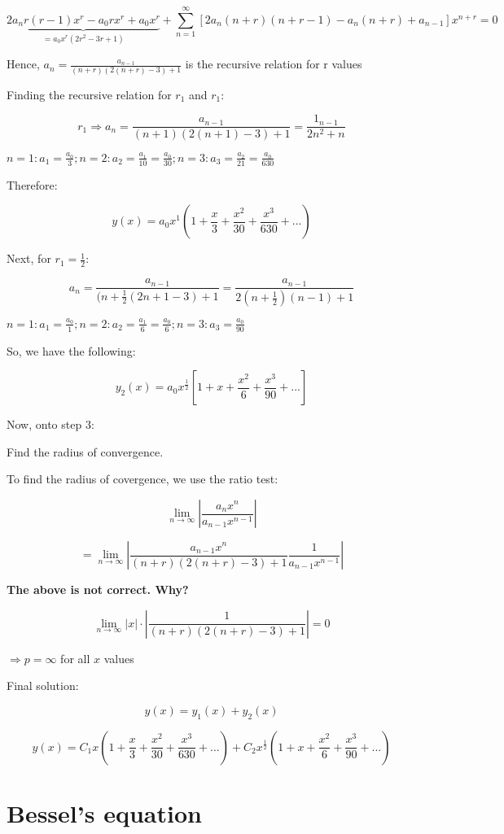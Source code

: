 \documentclass{article}
\begin{document}
$$\underbrace{2 a_n r(r-1)x^r - a_0 r x^r + a_0 x^r}_{ = a_0 x^r \left( 2r^2 - 3r + 1 \right)} + \sum_{n = 1}^\infty \left[ 2 a_n (n+r) (n+r-1) - a_n (n+r) + a_{n-1} \right] x^{n+r} = 0$$

Hence, $a_n = \frac{a_{n-1}}{(n+r)(2(n+r)-3) + 1}$ is the recursive relation for r values

Finding the recursive relation for $r_1$ and $r_1$:

$$r_1 \Rightarrow a_n = \frac{a_{n-1}}{(n+1)(2(n+1)-3)+1} = \frac{1_{n-1}}{2n^2 + n}$$

$n = 1: a_1 = \frac{a_0}{3}; n = 2: a_2 = \frac{a_1}{10} = \frac{a_0}{30}; n = 3: a_3 = \frac{a_2}{21} = \frac{a_0}{630}$

Therefore:

$$y(x) = a_0 x^1 (1 + \frac{x}{3} + \frac{x^2}{30} + \frac{x^3}{630} + ...)$$

Next, for $r_1 = \frac{1}{2}$:

$$a_n  =\frac{a_{n-1}}{(n + \frac{1}{2} (2n+1-3) + 1} = \frac{a_{n-1}}{2(n + \frac{1}{2})(n-1) + 1}$$

$n = 1: a_1 = \frac{a_0}{1}; n = 2:  a_2 = \frac{a_1}{6} = \frac{a_0}{6}; n = 3: a_3 = \frac{a_0}{90}$

So, we have the following:

$$y_2(x) = a_0 x^{\frac{1}{2}} \left[ 1 + x + \frac{x^2}{6} + \frac{x^3}{90} + ... \right]$$

Now, onto step 3:

Find the radius of convergence. 

To find the radius of covergence, we use the ratio test:

$$\lim_{n \to \infty} | \frac{a_n x^n}{a_{n-1}x^{n-1}}|$$

$$ = \lim_{n \to \infty} | \frac{a_{n-1} x^n}{(n+r) (2(n+r)-3) + 1} \frac{1}{a_{n-1} x^{n-1}} |$$

\textbf{The above is not correct. Why?}

$$\lim_{n \to \infty} |x| \cdot |\frac{1}{(n+r) (2(n+r)-3)+1}| = 0$$

$\Rightarrow p = \infty$ for all $x$ values

Final solution:

$$y(x) = y_1(x) + y_2(x)$$

$$y(x) = C_1 x \left(1 + \frac{x}{3} + \frac{x^2}{30} + \frac{x^3}{630} + ... \right) + C_2 x^\frac{1}{2} \left(1+x+\frac{x^2}{6} + \frac{x^3}{90} + ... \right)$$


\section{Bessel's equation}
\end{document}
